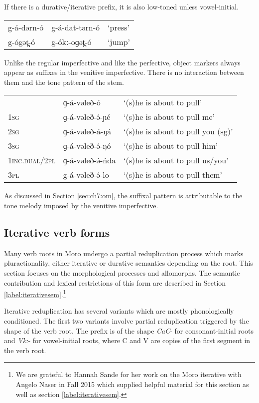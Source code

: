 If there is a durative/iterative prefix, it is also low-toned unless vowel-initial.

\ea 
\begin{tabular}[t]{lll}
g-á-dərn-ó	&	g-á-dat-tərn-ó	&	‘press’\\
g-ógət̪-ó	&	g-ókː-oɡət̪-ó	&	‘jump’\\ 	
\end{tabular}
\z  


Unlike the regular imperfective and like the perfective, object markers always appear as suffixes in the venitive imperfective. There is no interaction between them and the tone pattern of the stem.  

\ea 
\begin{tabular}[t]{lll}
&	ɡ-á-vəleð-ó	&	‘(s)he is about to pull’\\
\textsc{1sg}	&	ɡ-á-vəleð-ə́-ɲé	&	‘(s)he is about to pull me’\\
\textsc{2sg}	&	ɡ-á-vəleð-á-ŋá	&	‘(s)he is about to pull you (sg)’\\
\textsc{3sg}	&	ɡ-á-vəleð-ə́-ŋó	&	‘(s)he is about to pull him’\\
\textsc{1inc.dual}/\textsc{2pl}&	ɡ-á-vəleð-ə́-ńda&	‘(s)he is about to pull us/you’\\
\textsc{3pl}	&	g-á-vəleð-ə́-lo	&	‘(s)he is about to pull them’\\ 	
\end{tabular}
\z 
As discussed in Section \ref{sec:ch7:om}, the suffixal pattern is attributable to the tone melody imposed by the venitive imperfective.


\subsection{Iterative verb forms}\label{sec:ch11:iterative}

Many verb roots in Moro undergo a partial reduplication process which marks pluractionality, either iterative or durative semantics depending on the root. This section focuses on the morphological processes and allomorphs. The semantic contribution and lexical restrictions of this form are described in Section \ref{label:iterativesem}.\footnote{We are grateful to Hannah Sande for her work on the Moro iterative with Angelo Naser in Fall 2015 which supplied helpful material for this section as well as section \ref{label:iterativesem}.}

Iterative reduplication has several variants which are mostly phonologically conditioned. The first two variants involve partial reduplication triggered by the shape of the verb root. The prefix is of the shape \textit{CaC}- for consonant-initial roots and \textit{Vk:}- for vowel-initial roots, where C and V are copies of the first segment in the verb root. 

